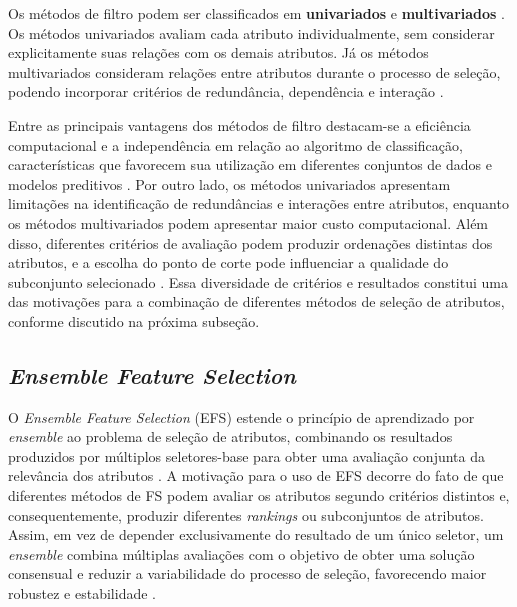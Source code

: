 Os métodos de filtro podem ser classificados em \textbf{univariados} e \textbf{multivariados} \cite{SolorioFernandez2020,Theng2024}. Os métodos univariados avaliam cada atributo individualmente, sem considerar explicitamente suas relações com os demais atributos. Já os métodos multivariados consideram relações entre atributos durante o processo de seleção, podendo incorporar critérios de redundância, dependência e interação \cite{SolorioFernandez2020,Dhal2022,Theng2024}.

Entre as principais vantagens dos métodos de filtro destacam-se a eficiência computacional e a independência em relação ao algoritmo de classificação, características que favorecem sua utilização em diferentes conjuntos de dados e modelos preditivos \cite{Dhal2022,Theng2024}. Por outro lado, os métodos univariados apresentam limitações na identificação de redundâncias e interações entre atributos, enquanto os métodos multivariados podem apresentar maior custo computacional. Além disso, diferentes critérios de avaliação podem produzir ordenações distintas dos atributos, e a escolha do ponto de corte pode influenciar a qualidade do subconjunto selecionado \cite{KHAIRE20221060,Theng2024}. Essa diversidade de critérios e resultados constitui uma das motivações para a combinação de diferentes métodos de seleção de atributos, conforme discutido na próxima subseção.

\subsection{\textit{Ensemble Feature Selection}}
\label{subsec:efs}

O \textit{Ensemble Feature Selection} (EFS) estende o princípio de aprendizado por \textit{ensemble} ao problema de seleção de atributos, combinando os resultados produzidos por múltiplos seletores-base para obter uma avaliação conjunta da relevância dos atributos \cite{bolon2019ensembles,salman2026review}. A motivação para o uso de EFS decorre do fato de que diferentes métodos de FS podem avaliar os atributos segundo critérios distintos e, consequentemente, produzir diferentes \textit{rankings} ou subconjuntos de atributos. Assim, em vez de depender exclusivamente do resultado de um único seletor, um \textit{ensemble} combina múltiplas avaliações com o objetivo de obter uma solução consensual e reduzir a variabilidade do processo de seleção, favorecendo maior robustez e estabilidade \cite{bolon2019ensembles,salman2026review}.

